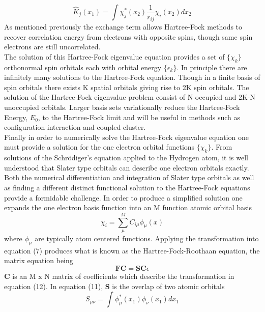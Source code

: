       \begin{equation}
      \hat{K}_j(x_1) = \int \chi_j^*(x_2) \frac{1}{r_{ij}} \chi_i(x_2) dx_2
      \end{equation}
    As mentioned previously the exchange term allows Hartree-Fock methods to recover correlation energy from electrons with opposite spins, though same spin electrons are still uncorrelated.  \\
    The solution of this Hartree-Fock eigenvalue equation provides a set of $\{ \chi_k \}$ orthonormal spin orbitals each with orbital energy $\{\epsilon_k\}$.  In principle there are infinitely many solutions to the Hartree-Fock equation.  Though in a finite basis of spin orbitals there exists K spatial orbitals giving rise to 2K spin orbitals.  The solution of the Hartree-Fock eigenvalue problem consist of N occupied and 2K-N unoccupied orbitals.  Larger basis sets variationally reduce the Hartree-Fock Energy, $E_0$, to the Hartree-Fock limit and will be useful in methods such as configuration interaction and coupled cluster.\cite{Szabo 1996}  \\
    Finally in order to numerically solve the Hartree-Fock eigenvalue equation one must provide a solution for the one electron orbital functions $\{\chi_k\}$.  From solutions of the Schr{\"o}diger's equation applied to the Hydrogen atom, it is well understood that Slater type orbitals can describe one electron orbitals exactly.  Both the numerical differentiation and integration of Slater type orbitals as well as finding a different distinct functional solution to the Hartree-Fock equations provide a formidable challenge. In order to produce a simplified solution one expands the one electron basis function into an M function atomic orbital basis
      \begin{equation}
      \chi_i = \sum_\mu^M C_{i\mu} \phi_\mu(x)
      \end{equation}
    where $\phi_\mu$ are typically atom centered functions.  Applying the transformation into equation (7) produces what is known as the Hartree-Fock-Roothaan equation\cite{Roothaan 1960, Roothaan 1951}, the matrix equation being 
      \begin{equation}
      \textbf{FC} = \textbf{SC}\epsilon
      \end{equation}
    \textbf{C} is an M x N matrix of coefficients which describe the transformation in equation (12).  In equation (11), \textbf{S} is the overlap of two atomic orbitals
      \begin{equation}
      S_{\mu\nu} = \int \phi^*_\mu(x_1) \phi_\nu(x_1) dx_1
      \end{equation}
